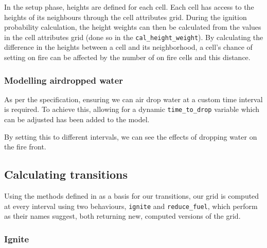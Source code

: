 \documentclass[11pt, a4paper, titlepage]{article}
\newcommand{\code}[1]{\colorbox{light-gray}{\texttt{#1}}}
\begin{document}
In the setup phase, heights are defined for each cell. Each cell has access to the heights of its neighbours through the cell attributes grid. During the ignition probability calculation, the height weights can then be calculated from the values in the cell attributes grid (done so in the \code{cal\_height\_weight}). By calculating the difference in the heights between a cell and its neighborhood, a cell's chance of setting on fire can be affected by the number of on fire cells and this distance. 

\subsubsection{Modelling airdropped water}
As per the specification, ensuring we can air drop water at a custom time interval is required. To achieve this, allowing for a dynamic \code{time\_to\_drop} variable which can be adjusted has been added to the model.

By setting this to different intervals, we can see the effects of dropping water on the fire front.

\subsection{Calculating transitions}

Using the methods defined in \cite{ALEXANDRIDIS2008191} as a basis for our transitions, our grid is computed at every interval using two behaviours, \code{ignite} and \code{reduce\_fuel}, which perform as their names suggest, both returning new, computed versions of the grid.

\subsubsection{Ignite}



\end{document}
